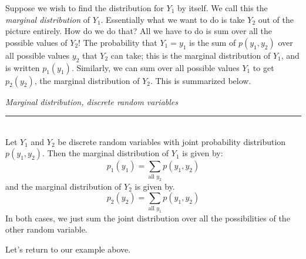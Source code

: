 \documentclass[12pt]{article}
\theoremstyle{definition}
\theoremstyle{remark}
\begin{document}
Suppose we wish to find the distribution for $Y_1$ by itself. We call this the \emph{marginal distribution} of $Y_1$. Essentially what we want to do is take $Y_2$ out of the picture entirely. How do we do that? All we have to do is sum over all the possible values of $Y_2$! The probability that $Y_1 = y_1$ is the sum of $p(y_1, y_2)$ over all possible values $y_2$ that $Y_2$ can take; this is the marginal distribution of $Y_1$, and is written $p_1(y_1)$. Similarly, we can sum over all possible values $Y_1$ to get $p_2(y_2)$, the marginal distribution of $Y_2$. This is summarized below.

\begin{framed}
\emph{Marginal distribution, discrete random variables}\\
  \rule{\dimexpr{}\fboxrule}{.1pt} \\
Let $Y_1$ and $Y_2$ be discrete random variables with joint probability distribution $p(y_1, y_2)$. Then the marginal distribution of $Y_1$ is given by:
\[
p_1(y_1) = \sum_{\text{all } y_2} p(y_1, y_2)
\]
and the marginal distribution of $Y_2$ is given by.
\[
p_2(y_2) = \sum_{\text{all } y_1} p(y_1, y_2)
\]
In both cases, we just sum the joint distribution over all the possibilities of the other random variable.
\end{framed}

Let's return to our example above.
\end{document}
